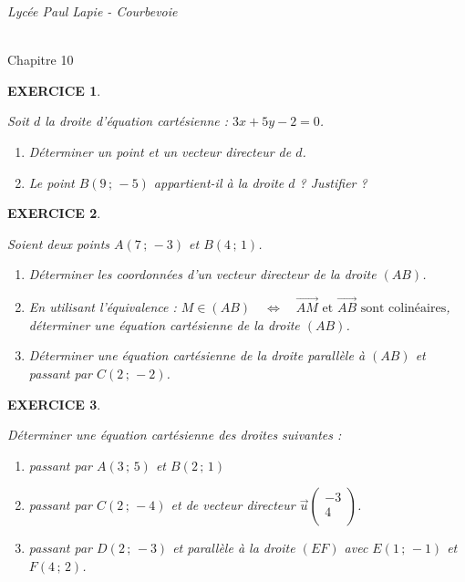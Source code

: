 \documentclass[a4paper]{article}   %
\renewcommand{\(}{\left(}
\renewcommand{\)}{\right)}
\newtheorem{EXO}{\large EXERCICE }
\newenvironment{EX}   { \setcounter{ques}{0} \begin{EXO} \hrulefill ~\vspace{0.3cm}

\normalfont}    {\end{EXO} \medskip}
\def\v{\overrightarrow}	%
\newcommand{\ssi}{\quad \Leftrightarrow \quad}	%
\def\cl{{\Large \bf{2nde}}}
\begin{document}
\newpage \setcounter{EXO}{0}
\noindent\begin{minipage}{.20\linewidth}\begin{center}                  
\noindent \emph{Lycée Paul Lapie - Courbevoie}
\end{center}\end{minipage}
\begin{minipage}{1.5\linewidth}\begin{center}	
\noindent \cl\\ Chapitre 10
\end{center}\end{minipage}

\begin{center} 	
\end{center}

\begin{EX}
Soit $d$ la droite d'équation cartésienne : $3x+5y-2=0$. 
\begin{enumerate}
\item Déterminer un point et un vecteur directeur de $d$. 
\item Le point $B(9\,;\,-5)$ appartient-il à la droite $d$ ? Justifier ?
\end{enumerate}

\end{EX}

\begin{EX} Soient deux points $A(7\,;\,-3)$ et $B(4\,;\,1)$.
\begin{enumerate}
\item Déterminer les coordonnées d'un vecteur directeur de la droite $(AB)$.
\item En utilisant l'équivalence : $M \in (AB) \ssi \v{AM} \text{ et } \v{AB} \text{ sont colinéaires}$, déterminer une équation cartésienne de la droite $(AB)$.
\item Déterminer une équation cartésienne de la droite parallèle à $(AB)$ et passant par $C(2\,;\,-2)$.
\end{enumerate}

\end{EX}

\begin{EX}
Déterminer une équation cartésienne des droites suivantes :
\begin{enumerate}
\item passant par $A(3\,;\,5)$ et $B(2 \,;\,1)$
\item passant par $C(2\,;\,-4)$ et de vecteur directeur $\v{u}\left (\begin{array}{c}
-3 \\
	4 \\
\end{array} \right)$.
\item passant par $D(2\,;\,-3)$ et parallèle à la droite $(EF)$ avec $E(1\,;\,-1)$ et $F(4\,;\, 2)$.
\end{enumerate}

\end{EX}
\end{document}
